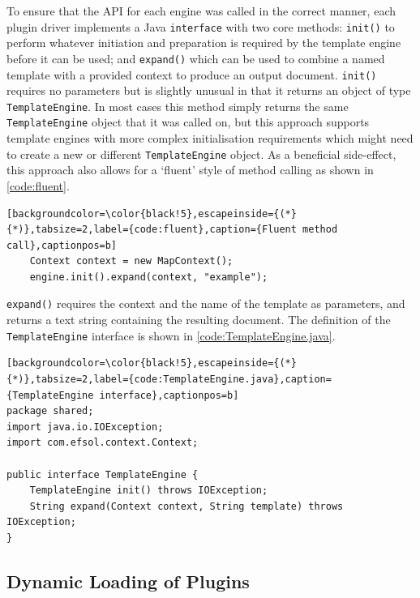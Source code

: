 To ensure that the API for each engine was called in the correct manner, each plugin driver implements a Java \verb!interface! with two core methods: \verb!init()! to perform whatever initiation and preparation is required by the template engine before it can be used; and \verb!expand()! which can be used to combine a named template with a provided context to produce an output document. \verb!init()! requires no parameters but is slightly unusual in that it returns an object of type \verb!TemplateEngine!. In most cases this method simply returns the same \verb!TemplateEngine! object that it was called on, but this approach supports template engines with more complex initialisation requirements which might need to create a new or different \verb!TemplateEngine! object. As a beneficial side-effect, this approach also allows for a `fluent' style of method calling \citep{JavaDesignPatterns} as shown in \autoref{code:fluent}.

\begin{lstlisting}[backgroundcolor=\color{black!5},escapeinside={(*}{*)},tabsize=2,label={code:fluent},caption={Fluent method call},captionpos=b]
    Context context = new MapContext();
    engine.init().expand(context, "example");
\end{lstlisting}

\verb!expand()! requires the context and the name of the template as parameters, and returns a text string containing the resulting document. The definition of the \verb!TemplateEngine! interface is shown in \autoref{code:TemplateEngine.java}.

\begin{lstlisting}[backgroundcolor=\color{black!5},escapeinside={(*}{*)},tabsize=2,label={code:TemplateEngine.java},caption={TemplateEngine interface},captionpos=b]
package shared;
import java.io.IOException;
import com.efsol.context.Context;

public interface TemplateEngine {
    TemplateEngine init() throws IOException;
    String expand(Context context, String template) throws IOException;
}\end{lstlisting}

\subsection{Dynamic Loading of Plugins}
\label{comp:plugins:dynamic}

